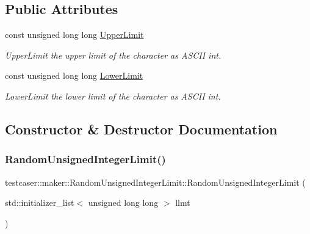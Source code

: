 \subsection*{Public Attributes}
\begin{DoxyCompactItemize}
\item 
const unsigned long long \mbox{\hyperlink{classtestcaser_1_1maker_1_1RandomUnsignedIntegerLimit_a02335f6ed09e057b47b5c40b584c71fe}{Upper\+Limit}}
\begin{DoxyCompactList}\small\item\em Upper\+Limit the upper limit of the character as A\+S\+C\+II int. \end{DoxyCompactList}\item 
const unsigned long long \mbox{\hyperlink{classtestcaser_1_1maker_1_1RandomUnsignedIntegerLimit_a78c820c6fa2a1e136a71141f5697ff7f}{Lower\+Limit}}
\begin{DoxyCompactList}\small\item\em Lower\+Limit the lower limit of the character as A\+S\+C\+II int. \end{DoxyCompactList}\end{DoxyCompactItemize}


\subsection{Constructor \& Destructor Documentation}
\mbox{\label{classtestcaser_1_1maker_1_1RandomUnsignedIntegerLimit_a8535b952828f59d17c69caae62f4c4e1}} 
\subsubsection{\texorpdfstring{RandomUnsignedIntegerLimit()}{RandomUnsignedIntegerLimit()}\hspace{0.1cm}{\footnotesize\ttfamily [1/2]}}
{\footnotesize\ttfamily testcaser\+::maker\+::\+Random\+Unsigned\+Integer\+Limit\+::\+Random\+Unsigned\+Integer\+Limit (\begin{DoxyParamCaption}\item[{std\+::initializer\+\_\+list$<$ unsigned long long $>$}]{llmt }\end{DoxyParamCaption})\hspace{0.3cm}{\ttfamily [inline]}}



